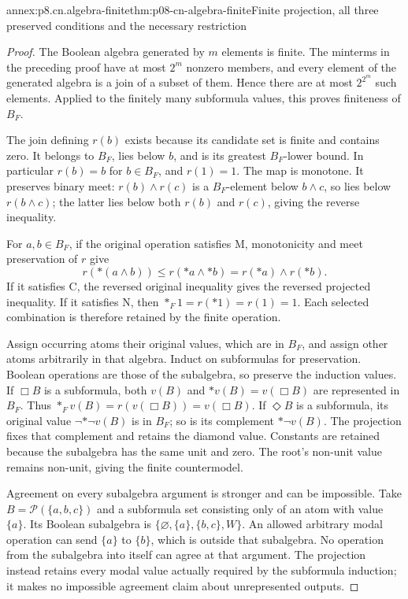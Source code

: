 \begin{annexitem}{annex:p8.cn.algebra-finite}{thm:p08-cn-algebra-finite}{Finite projection, all three preserved conditions and the necessary restriction}
\begin{proof}
The Boolean algebra generated by \(m\) elements is finite.
The minterms in the preceding proof have at most \(2^m\)
nonzero members, and every element of the generated algebra
is a join of a subset of them. Hence there are at most
\(2^{2^m}\) such elements. Applied to the finitely many
subformula values, this proves finiteness of \(B_F\).

The join defining \(r(b)\) exists because its candidate set
is finite and contains zero. It belongs to \(B_F\), lies
below \(b\), and is its greatest \(B_F\)-lower bound.
In particular \(r(b)=b\) for \(b\in B_F\), and
\(r(1)=1\). The map is monotone. It preserves binary meet:
\(r(b)\land r(c)\) is a \(B_F\)-element below
\(b\land c\), so lies below \(r(b\land c)\);
the latter lies below both \(r(b)\) and \(r(c)\),
giving the reverse inequality.

For \(a,b\in B_F\), if the original operation satisfies M,
monotonicity and meet preservation of \(r\) give
\[
 r(\ast(a\land b))\leq r(\ast a\land\ast b)
                   =r(\ast a)\land r(\ast b).
\]
If it satisfies C, the reversed original inequality gives the
reversed projected inequality. If it satisfies N, then
\(\ast_F1=r(\ast1)=r(1)=1\). Each selected combination
is therefore retained by the finite operation.

Assign occurring atoms their original values, which are in
\(B_F\), and assign other atoms arbitrarily in that algebra.
Induct on subformulas for preservation. Boolean operations are
those of the subalgebra, so preserve the induction values.
If \(\Box B\) is a subformula, both \(v(B)\) and
\(\ast v(B)=v(\Box B)\) are represented in \(B_F\).
Thus \(\ast_Fv(B)=r(v(\Box B))=v(\Box B)\).
If \(\Diamond B\) is a subformula, its original value
\(\neg\ast\neg v(B)\) is in \(B_F\); so is its
complement \(\ast\neg v(B)\). The projection fixes that
complement and retains the diamond value. Constants are retained
because the subalgebra has the same unit and zero. The root's
non-unit value remains non-unit, giving the finite countermodel.

Agreement on every subalgebra argument is stronger and can be
impossible. Take \(B=\mathcal P(\{a,b,c\})\) and a
subformula set consisting only of an atom with value \(\{a\}\).
Its Boolean subalgebra is
\(\{\varnothing,\{a\},\{b,c\},W\}\).
An allowed arbitrary modal operation can send \(\{a\}\)
to \(\{b\}\), which is outside that subalgebra. No operation
from the subalgebra into itself can agree at that argument.
The projection instead retains every modal value actually required
by the subformula induction; it makes no impossible agreement
claim about unrepresented outputs.
\end{proof}
\end{annexitem}

